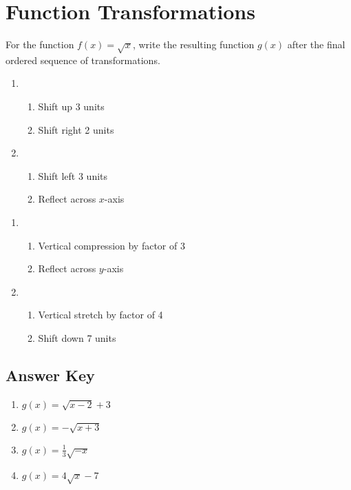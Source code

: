 \chapter{Function Transformations}

For the function $f(x) = \sqrt{x}$, write the resulting function $g(x)$ after the final ordered sequence of transformations.

\begin{multicols}{2}
\begin{enumerate}
	\item 
		\begin{enumerate}[(1)]
			\item Shift up 3 units
			\item Shift right 2 units
		\end{enumerate}
	\item 
		\begin{enumerate}[(1)]
			\item Shift left 3 units
			\item Reflect across $x$-axis
		\end{enumerate}
\end{enumerate}	\setcounter{Review}{\value{enumi}}
\end{multicols}

\begin{multicols}{2}
\begin{enumerate}		\setcounter{enumi}{\value{Review}}
	\item 
		\begin{enumerate}[(1)]
			\item Vertical compression by factor of 3
			\item Reflect across $y$-axis
		\end{enumerate}
	\item 
		\begin{enumerate}[(1)]
			\item Vertical stretch by factor of 4
			\item Shift down 7 units
		\end{enumerate}
\end{enumerate}	\setcounter{Review}{\value{enumi}}
\end{multicols}

\newpage

\section{Answer Key}

\begin{enumerate}
	\item $g(x) = \sqrt{x-2}+3$
	\item $g(x) = -\sqrt{x+3}$
	\item $g(x) = \frac{1}{3}\sqrt{-x}$
	\item $g(x) = 4\sqrt{x}-7$
\end{enumerate}